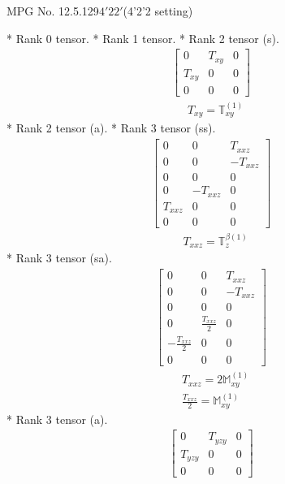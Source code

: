 \documentclass[fleqn,8pt,landscape]{jsarticle}
\begin{document}
\setcounter{MaxMatrixCols}{32}

\renewcommand{\tablename}{Table~}
\renewcommand{\figurename}{Figure~}
\begin{center}
\LARGE
MPG No. 12.5.129\quad$4'22'$\quad(4'2'2 setting)
\end{center}
* Rank 0 tensor.
* Rank 1 tensor.
* Rank 2 tensor (s).
\begin{align*}
\begin{bmatrix} 0 & T_{xy} & 0 \\ T_{xy} & 0 & 0 \\ 0 & 0 & 0 \end{bmatrix}
\end{align*}
\begin{align*}
& T_{xy} = \mathbb{T}_{xy}^{(1)}
\end{align*}
* Rank 2 tensor (a).
* Rank 3 tensor (ss).
\begin{align*}
\begin{bmatrix} 0 & 0 & T_{xxz} \\ 0 & 0 & - T_{xxz} \\ 0 & 0 & 0 \\ 0 & - T_{xxz} & 0 \\ T_{xxz} & 0 & 0 \\ 0 & 0 & 0 \end{bmatrix}
\end{align*}
\begin{align*}
& T_{xxz} = \mathbb{T}_{z}^{\beta(1)}
\end{align*}
* Rank 3 tensor (sa).
\begin{align*}
\begin{bmatrix} 0 & 0 & T_{xxz} \\ 0 & 0 & - T_{xxz} \\ 0 & 0 & 0 \\ 0 & \frac{T_{xxz}}{2} & 0 \\ - \frac{T_{xxz}}{2} & 0 & 0 \\ 0 & 0 & 0 \end{bmatrix}
\end{align*}
\begin{align*}
& T_{xxz} = 2 \mathbb{M}_{xy}^{(1)} \\
& \frac{T_{xxz}}{2} = \mathbb{M}_{xy}^{(1)}
\end{align*}
* Rank 3 tensor (a).
\begin{align*}
\begin{bmatrix} 0 & T_{yzy} & 0 \\ T_{yzy} & 0 & 0 \\ 0 & 0 & 0 \end{bmatrix}
\end{align*}
\end{document}
